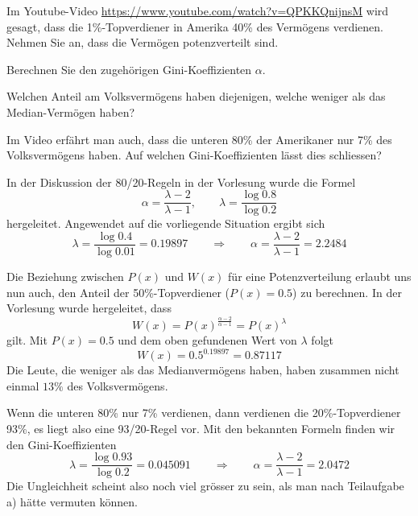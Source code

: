 Im Youtube-Video \url{https://www.youtube.com/watch?v=QPKKQnijnsM} wird
gesagt, dass die 1\%-Topverdiener in Amerika 40\% des Vermögens
verdienen. Nehmen Sie an, dass die Vermögen potenzverteilt sind.
\begin{teilaufgaben}
\item
Berechnen Sie den zugehörigen Gini-Koeffizienten $\alpha$.
\item
Welchen Anteil am Volksvermögens haben diejenigen, welche
weniger als das Median-Vermögen haben?
\item
Im Video erfährt man auch, dass die unteren 80\% der Amerikaner nur
7\% des Volksvermögens haben. 
Auf welchen Gini-Koeffizienten lässt dies schliessen?
\end{teilaufgaben}


\begin{loesung}
\begin{teilaufgaben}
\item
In der Diskussion der 80/20-Regeln in der Vorlesung wurde die Formel
\[
\alpha=\frac{\lambda-2}{\lambda-1},\qquad \lambda=\frac{\log 0.8}{\log 0.2}
\]
hergeleitet. Angewendet auf die vorliegende Situation ergibt sich
\[
\lambda=\frac{\log 0.4}{\log 0.01}=0.19897
\qquad
\Rightarrow
\qquad
\alpha=\frac{\lambda - 2}{\lambda - 1}=2.2484
\]
\item
Die Beziehung zwischen $P(x)$ und $W(x)$ für eine Potenzverteilung erlaubt
uns nun auch, den Anteil der 50\%-Topverdiener ($P(x)=0.5$) zu berechnen.
In der Vorlesung wurde hergeleitet, dass 
\[
W(x)=P(x)^\frac{\alpha - 2}{\alpha - 1}=P(x)^\lambda
\]
gilt. Mit $P(x)=0.5$ und dem oben gefundenen Wert von $\lambda$
folgt
\[
W(x)=0.5^{0.19897}=0.87117
\]
Die Leute, die weniger als das Medianvermögens haben, haben zusammen
nicht einmal $13\%$ des Volksvermögens.
\item
Wenn die unteren 80\% nur 7\% verdienen, dann verdienen die 20\%-Topverdiener
93\%, es liegt also eine 93/20-Regel vor. Mit den bekannten Formeln finden
wir den Gini-Koeffizienten
\[
\lambda=\frac{\log 0.93}{\log 0.2}=0.045091
\qquad\Rightarrow\qquad
\alpha=\frac{\lambda - 2}{\lambda - 1}=2.0472
\]
Die Ungleichheit scheint also noch viel grösser zu sein, als
man nach Teilaufgabe a) hätte vermuten können.
\qedhere
\end{teilaufgaben}
\end{loesung}


